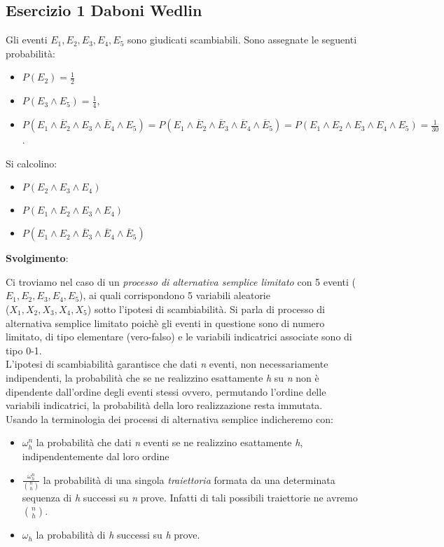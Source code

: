 \subsection{Esercizio 1 Daboni Wedlin}
Gli eventi $E_{1}, E_{2},  E_{3}, E_{4}, E_{5}$ sono giudicati scambiabili.
Sono assegnate le seguenti probabilità:
\begin{itemize}[label=]
	\item $P(E_{2})=\frac{1}{2}$
	\item $P(E_{3}\wedge E_{5})=\frac{1}{4},$ 
	\item $P(E_{1}\wedge\overline{E}_2\wedge E_{3}\wedge\overline{E}_{4}\wedge E_{5})=P(E_{1}\wedge\overline{E}_{2}\wedge\overline{E}_{3}\wedge\overline{E}_{4}\wedge\overline{E}_{5})=P(E_{1}\wedge E_{2}\wedge E_{3}\wedge E_{4}\wedge E_{5})=\frac{1}{30}$.
\end{itemize}

Si calcolino:
\begin{itemize}[label=]
	\item $P(E_{2}\wedge E_{3}\wedge E_{4})$
	\item $P(E_{1}\wedge E_{2}\wedge E_{3}\wedge E_{4})$
	\item $P(E_{1}\wedge E_{2}\wedge\overline{E}_{3}\wedge\overline{E}_{4}\wedge\overline{E}_{5})$
\end{itemize}

\textbf{Svolgimento}:
\\
\bigskip

Ci troviamo nel caso di un \textit{processo di alternativa semplice limitato} con 5 eventi ($E_{1}, E_{2},  E_{3}, E_{4}, E_{5}$), ai quali corrispondono 5 variabili aleatorie \\
($X_{1}, X_{2},  X_{3}, X_{4}, X_{5}$) sotto l’ipotesi di scambiabilità. Si parla di processo di alternativa semplice limitato poichè gli eventi in questione sono di numero limitato, di tipo elementare (vero-falso) e le variabili indicatrici associate sono di tipo 0-1. \\
L’ipotesi di scambiabilità garantisce che dati \textit{n} eventi, non necessariamente indipendenti, la probabilità che se ne realizzino esattamente \textit{h} su \textit{n} non è dipendente dall'ordine degli eventi stessi ovvero, permutando l’ordine delle variabili indicatrici, la probabilità della loro realizzazione resta immutata. \\

Usando la terminologia dei processi di alternativa semplice indicheremo con:
\begin{itemize}[label=-]
    \item $\omega^n_h$ la probabilità che dati \textit{n} eventi se ne realizzino esattamente \textit{h}, indipendentemente dal loro ordine
     \item $\frac{\omega^n_h}{\binom{n}{h}}$ la probabilità di una singola \textit{traiettoria} formata da una determinata sequenza di \textit{h} successi su \textit{n} prove. Infatti di tali possibili traiettorie ne avremo $\binom{n}{h}$.
    \item $\omega_h$ la probabilità di \textit{h} successi su \textit{h} prove.
\end{itemize}


